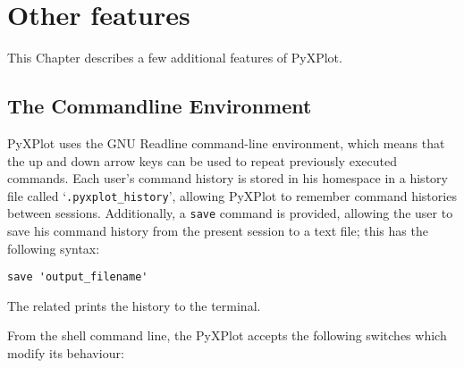 %
%
%
%
%



\chapter{Other features}

This Chapter describes a few additional features of PyXPlot.

\section{The Commandline Environment}

PyXPlot uses the GNU Readline command-line environment, which means that the up
and down arrow keys can be used to repeat previously executed commands. Each
user's command history is stored in his homespace in a history file called
`\texttt{.pyxplot\_history}', allowing PyXPlot to remember command histories
between sessions. Additionally, a \texttt{save} command is provided, allowing
the user to save his command history from the present session to a text file;
this has the following syntax:

\begin{verbatim}
save 'output_filename'
\end{verbatim}

The related  prints the history
to the terminal.

From the shell command line, the PyXPlot accepts the following switches which
modify its behaviour:

